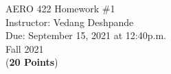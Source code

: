 \documentclass[]{book}
\begin{document}
\begin{center}
{\Large AERO 422 Homework \#1}\\
\vspace{0.2 cm}
Instructor: Vedang Deshpande\\ %
\vspace{0.2 cm}
Due: September 15, 2021 at 12:40p.m.\\
\vspace{0.2 cm}
Fall 2021\\
\vspace{0.2 cm}
(\textbf{20 Points})\\
\end{center}

\vspace{0.2 cm}


\end{document}
